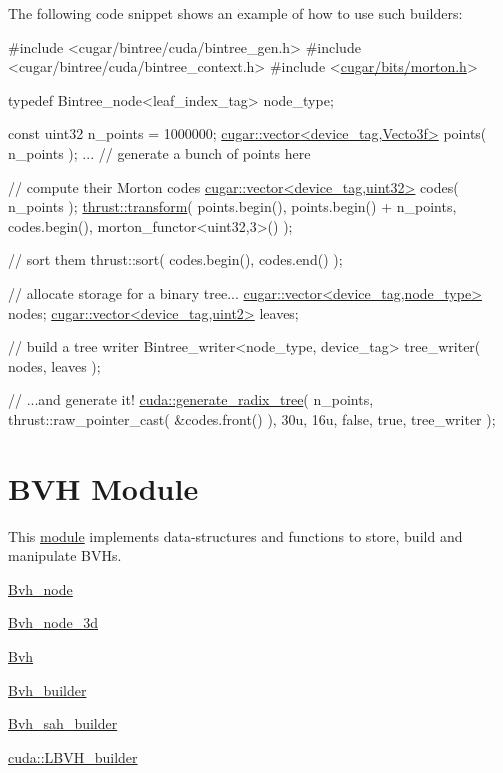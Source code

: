 The following code snippet shows an example of how to use such builders\+:


\begin{DoxyCode}
\textcolor{preprocessor}{#include <cugar/bintree/cuda/bintree\_gen.h>}
\textcolor{preprocessor}{#include <cugar/bintree/cuda/bintree\_context.h>}
\textcolor{preprocessor}{#include <\hyperlink{morton_8h}{cugar/bits/morton.h}>}

\textcolor{keyword}{typedef} Bintree\_node<leaf\_index\_tag> node\_type;

\textcolor{keyword}{const} uint32 n\_points = 1000000;
\hyperlink{structcugar_1_1vector}{cugar::vector<device\_tag,Vecto3f>} points( n\_points );
... \textcolor{comment}{// generate a bunch of points here}

\textcolor{comment}{// compute their Morton codes}
\hyperlink{structcugar_1_1vector}{cugar::vector<device\_tag,uint32>} codes( n\_points );
\hyperlink{group___primitives_gab584ee91ed39f9b1fec5aa0e7a0284a4}{thrust::transform}(
    points.begin(),
    points.begin() + n\_points,
    codes.begin(),
    morton\_functor<uint32,3>() );

\textcolor{comment}{// sort them}
thrust::sort( codes.begin(), codes.end() );

\textcolor{comment}{// allocate storage for a binary tree...}
\hyperlink{structcugar_1_1vector}{cugar::vector<device\_tag,node\_type>} nodes;
\hyperlink{structcugar_1_1vector}{cugar::vector<device\_tag,uint2>}     leaves;

\textcolor{comment}{// build a tree writer}
Bintree\_writer<node\_type, device\_tag> tree\_writer( nodes, leaves );

\textcolor{comment}{// ...and generate it!}
\hyperlink{group__radixtree_gafb888a81f085548c89a282181d74649a}{cuda::generate\_radix\_tree}(
    n\_points,
    thrust::raw\_pointer\_cast( &codes.front() ),
    30u,
    16u,
    \textcolor{keyword}{false},
    \textcolor{keyword}{true},
    tree\_writer );
\end{DoxyCode}
 \hypertarget{bvh_page}{}\section{B\+VH Module}\label{bvh_page}
\begin{DoxyParagraph}{}
This \hyperlink{group__bvh}{module} implements data-\/structures and functions to store, build and manipulate B\+V\+Hs.
\end{DoxyParagraph}

\begin{DoxyItemize}
\item \hyperlink{structcugar_1_1_bvh__node}{Bvh\+\_\+node}
\item \hyperlink{structcugar_1_1_bvh__node__3d}{Bvh\+\_\+node\+\_\+3d}
\item \hyperlink{structcugar_1_1_bvh}{Bvh}
\item \hyperlink{classcugar_1_1_bvh__builder}{Bvh\+\_\+builder}
\item \hyperlink{classcugar_1_1_bvh__sah__builder}{Bvh\+\_\+sah\+\_\+builder}
\item \hyperlink{structcugar_1_1cuda_1_1_l_b_v_h__builder}{cuda\+::\+L\+B\+V\+H\+\_\+builder}
\end{DoxyItemize}

